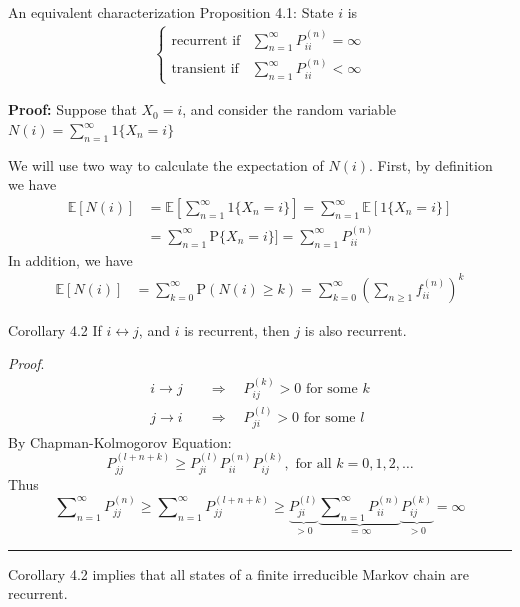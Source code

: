 \documentclass[letterpaper, mathserif]{beamer}
\def\p{\mathrm P}
\def\Sum{\sum\nolimits}
\def\X{\mathfrak{X}}
\begin{document}
\begin{frame}{An equivalent characterization}
Proposition 4.1: State $i$ is
\begin{align*}
\begin{cases}
\text{recurrent if}& \Sum_{n=1}^{\infty}P^{(n)}_{ii}=\infty\\
\text{transient if}& \Sum_{n=1}^{\infty}P^{(n)}_{ii}<\infty
\end{cases}
\end{align*}

{\bf Proof: }
Suppose that $X_0 = i$, and consider the random variable 
$N(i) = \sum_{n = 1}^{\infty} 1\{ X_n = i\}$

We will use two way to calculate the expectation of $N(i)$. 
First, by definition we have
\begin{align*}
\mathbb{E} [ N(i) ] &= \mathbb{E} [ \sum_{n = 1}^{\infty} 1\{ X_n = i\} ] 
=  \sum_{n = 1}^{\infty} \mathbb{E} [ 1\{ X_n = i\} ] \\
&= \sum_{n = 1}^{\infty} \p \{ X_n = i\} ] =  \Sum_{n=1}^{\infty}P^{(n)}_{ii}
\end{align*}
In addition, we have 
\begin{align*}
\mathbb{E} [ N(i) ] &= \sum_{k = 0}^{\infty} \p ( N(i) \geq k ) =
 \sum_{k = 0}^{\infty} ( \sum_{n \geq 1} f^{(n)}_{ii} )^k
\end{align*}
\end{frame}

%
%
%
%
\begin{frame}{Corollary 4.2}
If $i\longleftrightarrow j$, and $i$ is recurrent, then $j$ is also recurrent.\medskip

{\em Proof}.
\begin{align*}
i\to j\quad &\Rightarrow\quad P^{(k)}_{ij}>0\text{ for some }k\\
j\to i\quad &\Rightarrow\quad P^{(l)}_{ji}>0\text{ for some }l
\end{align*}
By Chapman-Kolmogorov Equation:
$$P_{jj}^{(l+n+k)}\ge P_{ji}^{(l)}P_{ii}^{(n)}P_{ij}^{(k)}, \text{ for all }k=0,1,2,\ldots$$
Thus
$$
\Sum_{n=1}^{\infty}P^{(n)}_{jj}
\ge \Sum_{n=1}^{\infty}P^{(l+n+k)}_{jj}
\ge \underbrace{P_{ji}^{(l)}}_{>0}\underbrace{\Sum_{n=1}^{\infty}P_{ii}^{(n)}}_{=\infty}\underbrace{P_{ij}^{(k)}}_{>0}
=\infty
$$
\hrule\medskip
Corollary 4.2 implies that all states of a finite irreducible Markov chain are recurrent.
\end{frame}
\end{document}
